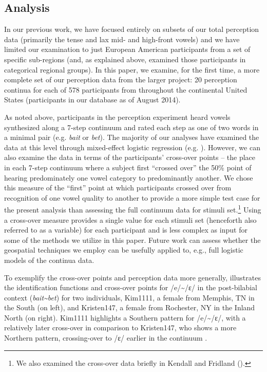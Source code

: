 \documentclass[output=paper]{LSP/langsci}
\begin{document}
\subsection{Analysis}
In our previous work, we have focused entirely on subsets of our total perception data (primarily the tense and lax mid- and high-front vowels) and we have limited our examination to just European American participants from a set of specific sub-regions (and, as explained above, examined those participants in categorical regional groups). In this paper, we examine, for the first time, a more complete set of our perception data from the larger project: 20 perception continua for each of 578 participants from throughout the continental United States (participants in our database as of August 2014). 

As noted above, participants in the perception experiment heard vowels synthesized along a 7-step continuum and rated each step as one of two words in a minimal pair (e.g. \textit{bait} or \textit{bet}). The majority of our analyses have examined the data at this level through mixed-effect logistic regression (e.g. \citealt{kendall_variation_2012}). However, we can also examine the data in terms of the participants’ cross-over points – the place in each 7-step continuum where a subject first “crossed over” the 50\% point of hearing predominately one vowel category to predominantly another. We chose this measure of the “first” point at which participants crossed over from recognition of one vowel quality to another to provide a more simple test case for the present analysis than assessing the full continuum data for stimuli set.\footnote{We also examined the cross-over data briefly in Kendall and Fridland (\citeyear{kendall_mapping_2010,kendall_variation_2012}).} Using a cross-over measure provides a single value for each stimuli set (henceforth also referred to as a variable) for each participant and is less complex as input for some of the methods we utilize in this paper. Future work can assess whether the geospatial techniques we employ can be usefully applied to, e.g., full logistic models of the continua data.

To exemplify the cross-over points and perception data more generally,  illustrates the identification functions and cross-over points for /e/{\textasciitilde}/ɛ/ in the post-bilabial context (\textit{bait{\textasciitilde}bet}) for two individuals, Kim1111, a female from Memphis, TN in the South (on left), and Kristen147, a female from Rochester, NY in the Inland North (on right). Kim1111 highlights a Southern pattern for /e/{\textasciitilde}/ɛ/, with a relatively later cross-over in comparison to Kristen147, who shows a more Northern pattern, crossing-over to /ɛ/ earlier in the continuum \citep{kendall_variation_2012}.
\end{document}
